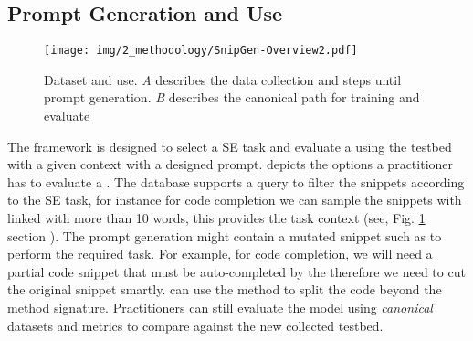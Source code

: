 \subsection{\snipgen Prompt Generation and Use}


\begin{figure}[ht]
		\centering
		\texttt{[image: img/2\_methodology/SnipGen-Overview2.pdf]}
		\caption{\snipgen Dataset and use. \textit{A} describes the \snipgen data collection and steps until prompt generation. \textit{B} describes the canonical path for training and evaluate \llms}
        \label{fig:overview}
\end{figure}

The \snipgen framework is designed to select a SE task and evaluate a \llm using the testbed with a given context with a designed prompt.  depicts the options a practitioner has to evaluate a \llm. The database supports a query to filter the snippets according to the SE task, for instance for code completion we can sample the snippets with linked \docstring with more than 10 words, this provides the task context (see, Fig. \ref{fig:overview} section ). The prompt generation might contain a mutated snippet such as \randomCut to perform the required task. For example, for code completion, we will need a partial code snippet that must be auto-completed by the \llm therefore we need to cut the original snippet smartly. \snipgen can use the \randomCut method to split the code beyond the method signature. Practitioners can still evaluate the model using \textit{canonical} datasets and metrics to compare against the new collected \snipgen testbed.
